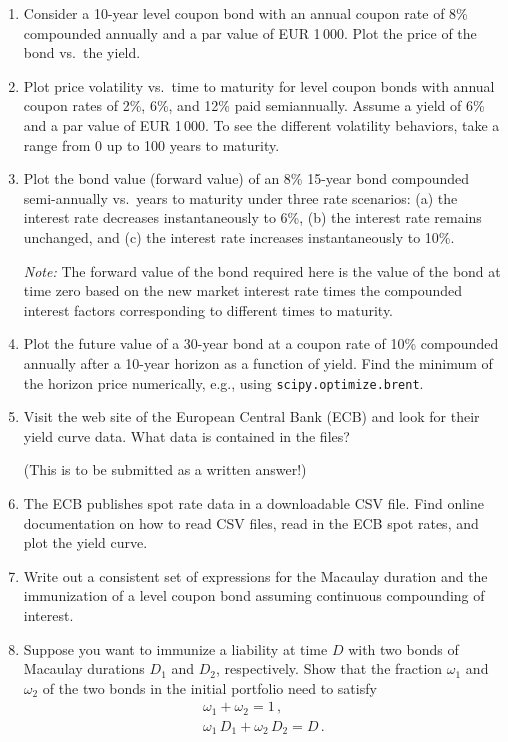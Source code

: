 \documentclass[12pt]{article}
\begin{document}
\begin{enumerate}
\item Consider a 10-year level coupon bond with an annual coupon rate
of 8\% compounded annually and a par value of EUR 1\,000.  Plot the
price of the bond vs.\ the yield.

\item Plot price volatility vs.\ time to maturity for level coupon
bonds with annual coupon rates of 2\%, 6\%, and 12\% paid semiannually.
Assume a yield of 6\% and a par value of EUR 1\,000.  To see the
different volatility behaviors, take a range from 0 up to 100 years to
maturity. 

\item Plot the bond value (forward value) of an 8\% 15-year bond
compounded semi-annually vs.\ years to maturity under three rate
scenarios: (a) the interest rate decreases instantaneously to 6\%, (b)
the interest rate remains unchanged, and (c) the interest rate
increases instantaneously to 10\%.

\emph{Note:} The forward value of the bond required here is the value
of the bond at time zero based on the new market interest rate times
the compounded interest factors corresponding to different times to
maturity.

\item Plot the future value of a 30-year bond at a coupon rate of 10\%
compounded annually after a 10-year horizon as a function of yield.
Find the minimum of the horizon price numerically, e.g., using
\texttt{scipy.optimize.brent}. 

\item Visit the web site of the European Central Bank (ECB) and look
for their yield curve data.  What data is contained in the files?

(This is to be submitted as a written answer!)

\item The ECB publishes spot rate data in a downloadable CSV file.
Find online documentation on how to read CSV files, read in the ECB
spot rates, and plot the yield curve.

\item Write out a consistent set of expressions for the Macaulay
duration and the immunization of a level coupon bond assuming
continuous compounding of interest.

\item Suppose you want to immunize a liability at time $D$ with
two bonds of Macaulay durations $D_1$ and $D_2$, respectively.  Show
that the fraction $\omega_1$ and $\omega_2$ of the two bonds in the
initial portfolio need to satisfy
\begin{gather*}
  \omega_1 + \omega_2 = 1 \,, \\
  \omega_1 \, D_1 + \omega_2 \, D_2 = D \,.
\end{gather*}

\end{enumerate}
\end{document}
